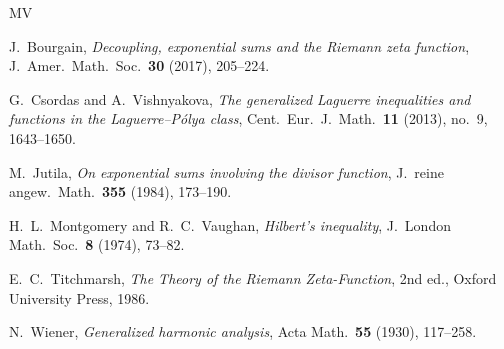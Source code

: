 \documentclass[12pt]{amsart}
\theoremstyle{remark}
\begin{document}
\begin{thebibliography}{MV}

J.~Bourgain,
\textit{Decoupling, exponential sums and the Riemann zeta function},
J.\ Amer.\ Math.\ Soc.\ \textbf{30} (2017), 205--224.

G.~Csordas and A.~Vishnyakova,
\textit{The generalized Laguerre inequalities and functions in the
Laguerre--P\'olya class},
Cent.\ Eur.\ J.\ Math.\ \textbf{11} (2013), no.~9, 1643--1650.

M.~Jutila,
\textit{On exponential sums involving the divisor function},
J.\ reine angew.\ Math.\ \textbf{355} (1984), 173--190.

H.~L.~Montgomery and R.~C.~Vaughan,
\textit{Hilbert's inequality},
J.\ London Math.\ Soc.\ \textbf{8} (1974), 73--82.

E.~C.~Titchmarsh,
\textit{The Theory of the Riemann Zeta-Function},
2nd ed., Oxford University Press, 1986.

N.~Wiener,
\textit{Generalized harmonic analysis},
Acta Math.\ \textbf{55} (1930), 117--258.

\end{thebibliography}
\end{document}
